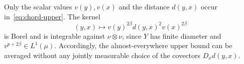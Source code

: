 Only the scalar values $v(y),v(x)$ and the distance $d(y,x)$
occur in~\eqref{eq:chord-upper}. The kernel
\[
 (y,x)\longmapsto
          v(y)^{2\beta}d(y,x)^2v(x)^{2\beta}
\]
is Borel and is integrable against $\nu\otimes\nu$, since $Y$
has finite diameter and $v^{p+2\beta}\in L^1(\mu)$. Accordingly,
the almost-everywhere upper bound can be averaged without any
jointly measurable choice of the covectors $D_xd(y,x)$.
